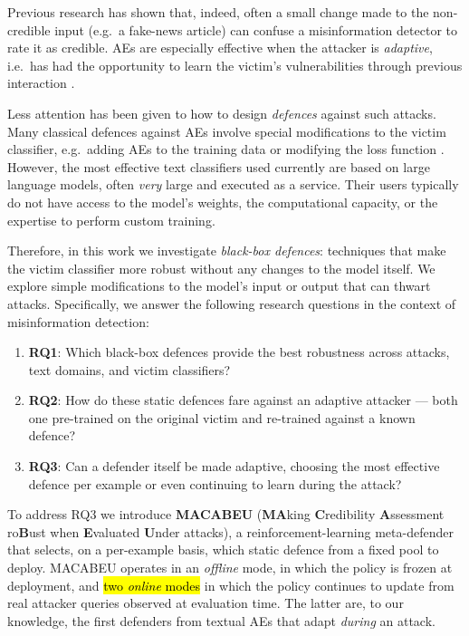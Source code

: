 \documentclass[11pt]{article}
\begin{document}
Previous research \cite{verifying_robustness} has shown that, indeed, often a small change made to the non-credible input (e.g.\ a fake-news article) can confuse a misinformation detector to rate it as credible. AEs are especially effective when the attacker is \textit{adaptive}, i.e.\ has had the opportunity to learn the victim's vulnerabilities through previous interaction \citep{przybyla-etal-2024-know}.

Less attention has been given to how to design \textit{defences} against such attacks. Many classical defences against AEs involve special modifications to the victim classifier, e.g.\ adding AEs to the training data or modifying the loss function \citep{Goyal2023survey}. However, the most effective text classifiers used currently are based on large language models, often \textit{very} large and executed as a service. Their users typically do not have access to the model's weights, the computational capacity, or the expertise to perform custom training.

Therefore, in this work we investigate \textit{black-box defences}: techniques that make the victim classifier more robust without any changes to the model itself. We explore simple modifications to the model's input or output that can thwart attacks. Specifically, we answer the following research questions in the context of misinformation detection:
\begin{enumerate}
    \item \textbf{RQ1}: Which black-box defences provide the best robustness across attacks, text domains, and victim classifiers?
    \item \textbf{RQ2}: How do these static defences fare against an adaptive attacker --- both one pre-trained on the original victim and re-trained against a known defence?
    \item \textbf{RQ3}: Can a defender itself be made adaptive, choosing the most effective defence per example or even continuing to learn during the attack?
\end{enumerate}

To address RQ3 we introduce \textbf{MACABEU} (\textbf{MA}king \textbf{C}redibility \textbf{A}ssessment ro\textbf{B}ust when \textbf{E}valuated \textbf{U}nder attacks), a reinforcement-learning meta-defender that selects, on a per-example basis, which static defence from a fixed pool to deploy. MACABEU operates in an \emph{offline} mode, in which the policy is frozen at deployment, and \hl{two \emph{online} modes} in which the policy continues to update from real attacker queries observed at evaluation time. The latter are, to our knowledge, the first defenders from textual AEs that adapt \emph{during} an attack.
\end{document}
